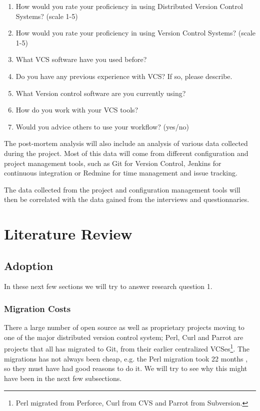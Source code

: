 \documentclass{llncs}
\begin{document}
\begin{enumerate}
 \item How would you rate your proficiency in using Distributed
       Version Control Systems? (scale 1-5)
 \item How would you rate your proficiency in using Version Control
       Systems? (scale 1-5)
 \item What VCS software have you used before?
 \item Do you have any previous experience with VCS? If so, please
       describe.
 \item What Version control software are you currently using?
 \item How do you work with your VCS tools?
 \item Would you advice others to use your workflow? (yes/no)
\end{enumerate}

The post-mortem analysis will also include an analysis of various data
collected during the project. Most of this data will come from
different configuration and project management tools, such as Git for
Version Control, Jenkins for continuous integration or Redmine for
time management and issue tracking.

The data collected from the project and configuration management tools
will then be correlated with the data gained from the interviews and
questionnaries.

\section{Literature Review}
\label{sec:litrev}

\subsection{Adoption}

In these next few sections we will try to answer research question 1.

\subsubsection{Migration Costs}

There a large number of open source as well as proprietary projects
moving to one of the major distributed version control system; Perl,
Curl and Parrot are projects that all has migrated to Git, from their
earlier centralized VCSes\footnote{
 Perl migrated from Perforce, Curl from CVS and Parrot from Subversion.
}. The migrations has not always been cheap, e.g. the Perl migration 
took 22 months \cite{alwis09}, so they must have had good reasons to 
do it. We will try to see why this might have been in the next few
subsections.
\end{document}
